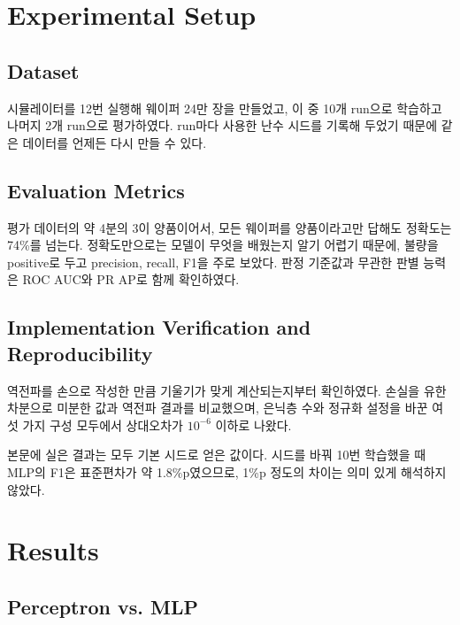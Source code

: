 \documentclass[10pt,twocolumn,a4paper]{article}
\begin{document}
\section{Experimental Setup}

\subsection{Dataset}

시뮬레이터를 12번 실행해 웨이퍼 24만 장을 만들었고, 이 중 10개 run으로 학습하고 나머지
2개 run으로 평가하였다. run마다 사용한 난수 시드를 기록해 두었기 때문에 같은 데이터를 언제든
다시 만들 수 있다.

\subsection{Evaluation Metrics}

평가 데이터의 약 4분의 3이 양품이어서, 모든 웨이퍼를 양품이라고만 답해도 정확도는 74\%를
넘는다. 정확도만으로는 모델이 무엇을 배웠는지 알기 어렵기 때문에, 불량을 positive로 두고
precision, recall, F1을 주로 보았다. 판정 기준값과 무관한 판별 능력은 ROC AUC와 PR
AP\cite{davis,saito}로 함께 확인하였다.

\subsection{Implementation Verification and Reproducibility}

역전파를 손으로 작성한 만큼 기울기가 맞게 계산되는지부터 확인하였다. 손실을 유한차분으로
미분한 값과 역전파 결과를 비교했으며, 은닉층 수와 정규화 설정을 바꾼 여섯 가지 구성 모두에서
상대오차가 $10^{-6}$ 이하로 나왔다.

본문에 실은 결과는 모두 기본 시드로 얻은 값이다. 시드를 바꿔 10번 학습했을 때 MLP의 F1은
표준편차가 약 1.8\%p였으므로, 1\%p 정도의 차이는 의미 있게 해석하지 않았다.

\section{Results}\label{sec:results}

\subsection{Perceptron vs. MLP}
\end{document}
